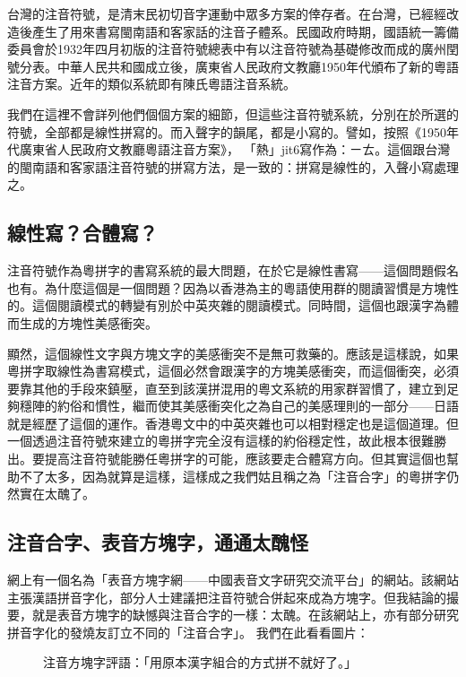 \documentclass[a5paper, 12pt, openany]{book} %
\begin{document}
台灣的注音符號，是清末民初切音字運動中眾多方案的倖存者。在台灣，已經經改造後產生了用來書寫閩南語和客家話的注音子體系。民國政府時期，國語統一籌備委員會於1932年四月初版的注音符號總表中有以注音符號為基礎修改而成的廣州閏號分表。中華人民共和國成立後，廣東省人民政府文教廳1950年代頒布了新的粵語注音方案。近年的類似系統即有陳氏粵語注音系統。 

我們在這裡不會詳列他們個個方案的細節，但這些注音符號系統，分別在於所選的符號，全部都是線性拼寫的。而入聲字的韻尾，都是小寫的。譬如，按照《1950年代廣東省人民政府文教廳粵語注音方案》， 「熱」jit6寫作為：ㄧㄊ。這個跟台灣的閩南語和客家語注音符號的拼寫方法，是一致的：拼寫是線性的，入聲小寫處理之。

\subsection{線性寫？合體寫？}

注音符號作為粵拼字的書寫系統的最大問題，在於它是線性書寫——這個問題假名也有。為什麼這個是一個問題？因為以香港為主的粵語使用群的閱讀習慣是方塊性的。這個閱讀模式的轉變有別於中英夾雜的閱讀模式。同時間，這個也跟漢字為體而生成的方塊性美感衝突。

顯然，這個線性文字與方塊文字的美感衝突不是無可救藥的。應該是這樣說，如果粵拼字取線性為書寫模式，這個必然會跟漢字的方塊美感衝突，而這個衝突，必須要靠其他的手段來鎮壓，直至到該漢拼混用的粵文系統的用家群習慣了，建立到足夠穩陣的約俗和慣性，繼而使其美感衝突化之為自己的美感理則的一部分——日語就是經歷了這個的運作。香港粵文中的中英夾雜也可以相對穩定也是這個道理。但一個透過注音符號來建立的粵拼字完全沒有這樣的約俗穩定性，故此根本很難勝出。要提高注音符號能勝任粵拼字的可能，應該要走合體寫方向。但其實這個也幫助不了太多，因為就算是這樣，這樣成之我們姑且稱之為「注音合字」的粵拼字仍然實在太醜了。

\subsection{注音合字、表音方塊字，通通太醜怪}

網上有一個名為「表音方塊字網——中國表音文字研究交流平台」的網站。該網站主張漢語拼音字化，部分人士建議把注音符號合併起來成為方塊字。但我結論的撮要，就是表音方塊字的缺憾與注音合字的一樣：太醜。在該網站上，亦有部分研究拼音字化的發燒友訂立不同的「注音合字」。 我們在此看看圖片：

\begin{figure}[h]
\centering
\caption{注音方塊字評語：「用原本漢字組合的方式拼不就好了。」}
\end{figure}
\end{document}
